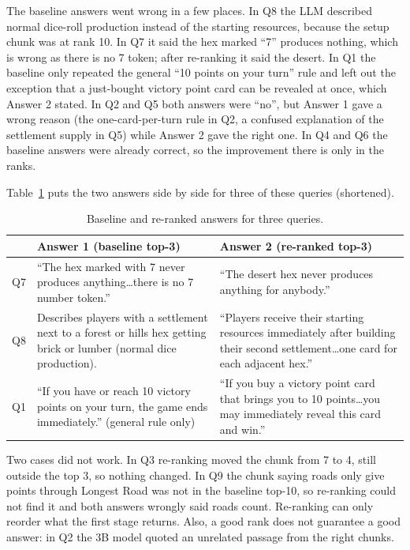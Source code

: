 \documentclass[11pt,a4paper]{article}
\begin{document}
The baseline answers went wrong in a few places. In Q8 the LLM described normal dice-roll production instead of the starting resources, because the setup chunk was at rank 10. In Q7 it said the hex marked ``7'' produces nothing, which is wrong as there is no 7 token; after re-ranking it said the desert. In Q1 the baseline only repeated the general ``10 points on your turn'' rule and left out the exception that a just-bought victory point card can be revealed at once, which Answer 2 stated. In Q2 and Q5 both answers were ``no'', but Answer 1 gave a wrong reason (the one-card-per-turn rule in Q2, a confused explanation of the settlement supply in Q5) while Answer 2 gave the right one. In Q4 and Q6 the baseline answers were already correct, so the improvement there is only in the ranks.

Table~\ref{tab:answers} puts the two answers side by side for three of these queries (shortened).

\begin{table}[h]
\centering
\small
\begin{tabular}{@{}l p{5.6cm} p{5.6cm}@{}}
\toprule
 & Answer 1 (baseline top-3) & Answer 2 (re-ranked top-3) \\
\midrule
Q7 & ``The hex marked with 7 never produces anything\ldots there is no 7 number token.'' & ``The desert hex never produces anything for anybody.'' \\[0.4em]
Q8 & Describes players with a settlement next to a forest or hills hex getting brick or lumber (normal dice production). & ``Players receive their starting resources immediately after building their second settlement\ldots one card for each adjacent hex.'' \\[0.4em]
Q1 & ``If you have or reach 10 victory points on your turn, the game ends immediately.'' (general rule only) & ``If you buy a victory point card that brings you to 10 points\ldots you may immediately reveal this card and win.'' \\
\bottomrule
\end{tabular}
\caption{Baseline and re-ranked answers for three queries.}
\label{tab:answers}
\end{table}

Two cases did not work. In Q3 re-ranking moved the chunk from 7 to 4, still outside the top 3, so nothing changed. In Q9 the chunk saying roads only give points through Longest Road was not in the baseline top-10, so re-ranking could not find it and both answers wrongly said roads count. Re-ranking can only reorder what the first stage returns. Also, a good rank does not guarantee a good answer: in Q2 the 3B model quoted an unrelated passage from the right chunks.
\end{document}
